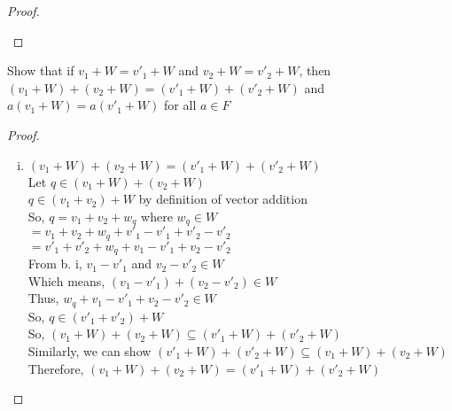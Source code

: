 \documentclass[11pt]{scrartcl}
\begin{document}
\begin{enumerate}[label=\alph*.]
{{\begin{proof}
\begin{enumerate}[i.]
{				}
			\end{enumerate}
		 \end{proof}
		}
	\item{
			Show that if $v_1 + W = v'_1 + W$ and $v_2 + W = v'_2 + W$, then \\
			$(v_1 + W) + (v_2 + W) = (v'_1 + W) + (v'_2 + W)$ and \\
			$a(v_1 + W) = a(v'_1 + W)$ for all $a \in F$
			\begin{proof}
				\-\
			\begin{enumerate}[i.]
				\item{
					$(v_1 + W) + (v_2 + W) = (v'_1 + W) + (v'_2 + W)$\\
					Let $q \in (v_1 + W) + (v_2 + W)$\\
					$q \in (v_1 + v_2) + W$ by definition of vector addition \\
					So, $q = v_1 + v_2 + w_q$ where $w_q \in W$\\
					$ = v_1 + v_2 + w_q + v'_1 - v'_1 + v'_2 - v'_2$\\
					$ = v'_1 + v'_2 + w_q + v_1 - v'_1 + v_2 - v'_2$\\
					From b. i, $v_1 - v'_1$ and $v_2 - v'_2 \in W$\\
					Which means, $(v_1 - v'_1) + (v_2 - v'_2) \in W$\\
					Thus, $w_q + v_1 - v'_1 + v_2 - v'_2 \in W$\\
					So, $q \in (v'_1 + v'_2) + W$\\
					So, $(v_1 + W) + (v_2 + W) \subseteq (v'_1 + W) + (v'_2 + W)$\\
					Similarly, we can show $(v'_1 + W) + (v'_2 + W) \subseteq (v_1 + W) + (v_2 + W)$\\
					Therefore, $(v_1 + W) + (v_2 + W) = (v'_1 + W) + (v'_2 + W)$\\
					
}
\end{enumerate}
\end{proof}}}
\end{enumerate}
\end{document}
